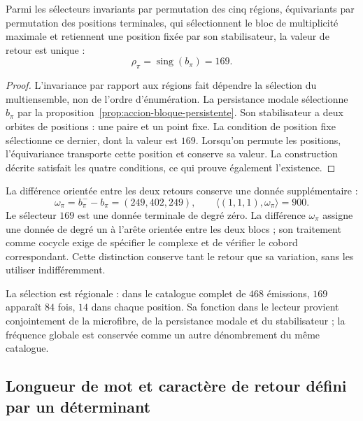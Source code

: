 \begin{theorem}
\label{thm:accion-selector-169}
Parmi les sélecteurs invariants par permutation des cinq régions,
équivariants par permutation des positions terminales, qui
sélectionnent le bloc de multiplicité maximale et retiennent une position
fixée par son stabilisateur, la valeur de retour est unique :
\[
 \rho_\pi=\operatorname{sing}(b_\pi)=169.
\]
\end{theorem}
\begin{proof}
L’invariance par rapport aux régions fait dépendre la sélection du
multiensemble, non de l’ordre d’énumération. La persistance modale
sélectionne \(b_\pi\) par la proposition~\ref{prop:accion-bloque-persistente}.
Son stabilisateur a deux orbites de positions : une paire et un point fixe.
La condition de position fixe sélectionne ce dernier, dont la valeur est
\(169\). Lorsqu’on permute les positions, l’équivariance transporte cette
position et conserve sa valeur. La construction décrite satisfait les
quatre conditions, ce qui prouve également l’existence.
\end{proof}

La différence orientée entre les deux retours conserve une donnée supplémentaire :
\[
 \omega_\pi=b_\pi^- - b_\pi=(249,402,249),\qquad
 \langle(1,1,1),\omega_\pi\rangle=900.
\]
Le sélecteur \(169\) est une donnée terminale de degré zéro. La différence
\(\omega_\pi\) assigne une donnée de degré un à l’arête orientée entre
les deux blocs ; son traitement comme cocycle exige de spécifier le complexe
et de vérifier le cobord correspondant. Cette distinction conserve tant
le retour que sa variation, sans les utiliser indifféremment.

La sélection est régionale : dans le catalogue complet de \(468\) émissions,
\(169\) apparaît \(84\) fois, \(14\) dans chaque position. Sa fonction dans
le lecteur provient conjointement de la microfibre, de la persistance modale et du
stabilisateur ; la fréquence globale est conservée comme un autre
dénombrement du même catalogue.

\subsection{Longueur de mot et caractère de retour défini par un déterminant}
\label{sec:accion-grado-determinante}

